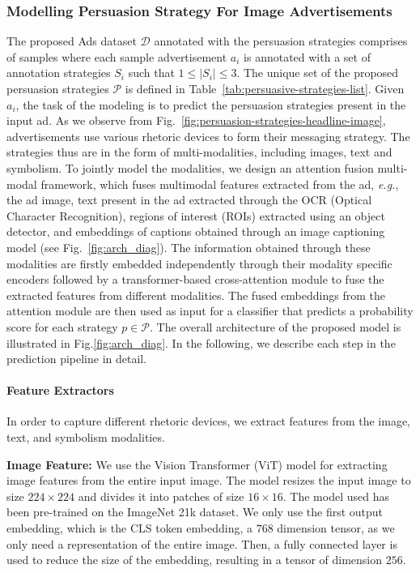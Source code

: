 \subsubsection{Modelling Persuasion Strategy For Image Advertisements}
The proposed Ads dataset $\mathcal{D}$ annotated with the persuasion strategies comprises of samples where each sample advertisement $a_i$ is annotated with a set of annotation strategies $S_i$ such that $1\le|{S_i}|\le3$. The unique set of the proposed persuasion strategies $\mathcal{P}$ is defined in Table~\ref{tab:persuasive-strategies-list}. Given $a_i$, the task of the modeling is to predict the persuasion strategies present in the input ad. As we observe from Fig.~\ref{fig:persuasion-strategies-headline-image}, advertisements use various rhetoric devices to form their messaging strategy. The strategies thus are in the form of multi-modalities, including images, text and symbolism. To jointly model the modalities, we design an attention fusion multi-modal framework, which fuses multimodal features extracted from the ad, {\it e.g.}, the ad image, text present in the ad extracted through the OCR (Optical Character Recognition), regions of interest (ROIs) extracted using an object detector, and embeddings of captions obtained through an image captioning model (see Fig.~\ref{fig:arch_diag}). The information obtained through these modalities are firstly embedded independently through their modality specific encoders followed by a transformer-based cross-attention module to fuse the extracted features from different modalities. The fused embeddings from the attention module are then used as input for a classifier that predicts a probability score for each strategy $p \in \mathcal{P}$. The overall architecture of the proposed model is illustrated in Fig.\ref{fig:arch_diag}. In the following, we describe each step in the prediction pipeline in detail.


\paragraph{Feature Extractors} 

In order to capture different rhetoric devices, we extract features from the image, text, and symbolism modalities.

\textbf{Image Feature:} We use the Vision Transformer \cite{dosovitskiy2020image} (ViT) model for extracting image features from the entire input image. The model resizes the input image to size $224 \times 224$ and divides it into patches of size $16 \times 16$. The model used has been pre-trained on the ImageNet 21k dataset. We only use the first output embedding, which is the CLS token embedding, a $768$ dimension tensor, as we only need a representation of the entire image. Then, a fully connected layer is used to reduce the size of the embedding, resulting in a tensor of dimension $256$.





